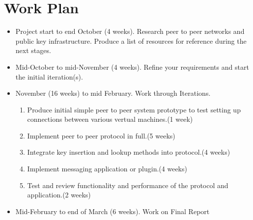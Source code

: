 \documentclass[
10pt, %
a4paper, %
oneside, %
headinclude,footinclude, %
BCOR5mm, %
]{scrartcl}
\begin{document}
\section{Work Plan}
  
\begin{itemize}
  \item Project start to end October (4 weeks). Research peer to peer networks and public key infrastructure. Produce a list of resources for reference during the next stages.
  \item Mid-October to mid-November (4 weeks). Refine your requirements and start the initial iteration(s).
  \item November (16 weeks) to mid February. Work through Iterations.
    \begin{enumerate}
      \item Produce initial simple peer to peer system prototype to test setting up connections between various vertual machines.(1 week)
      \item Implement peer to peer protocol in full.(5 weeks)
      \item Integrate key insertion and lookup methods into protocol.(4 weeks)
      \item Implement messaging application or plugin.(4 weeks)
      \item Test and review functionality and performance of the protocol and application.(2 weeks)
    \end{enumerate}
  \item Mid-February to end of March (6 weeks). Work on Final Report
\end{itemize}
  





\end{document}
